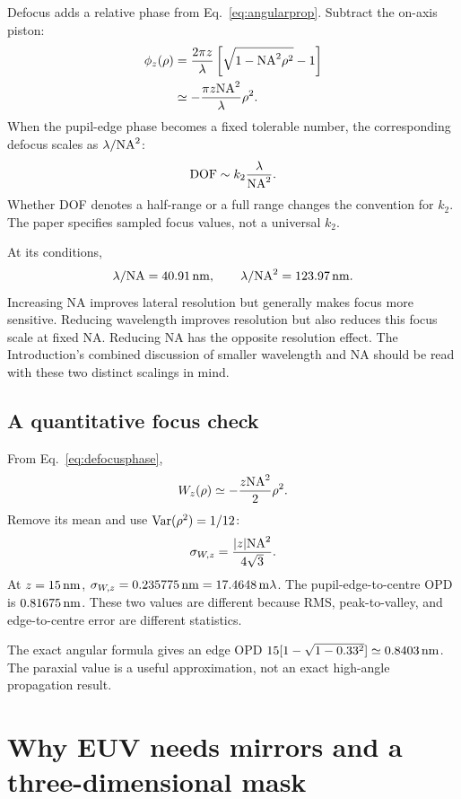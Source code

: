 Defocus adds a relative phase from Eq.~\eqref{eq:angularprop}.
Subtract the on-axis piston:
\begin{align}
\phi_z(\rho)
&=\frac{2\pi z}{\lambda}
\left[\sqrt{1-\mathrm{NA}^2\rho^2}-1\right]\\
&\simeq-\frac{\pi z\mathrm{NA}^2}{\lambda}\rho^2.
\label{eq:defocusphase}
\end{align}
When the pupil-edge phase becomes a fixed tolerable number, the
corresponding defocus scales as $\lambda/\mathrm{NA}^2$:
\begin{equation}
\mathrm{DOF}\sim k_2\frac{\lambda}{\mathrm{NA}^2}.
\end{equation}
Whether DOF denotes a half-range or a full range changes the convention
for $k_2$. The paper specifies sampled focus values, not a universal $k_2$.

At its conditions,
\[
\lambda/\mathrm{NA}=40.91\,\mathrm{nm},\qquad
\lambda/\mathrm{NA}^2=123.97\,\mathrm{nm}.
\]
Increasing NA improves lateral resolution but generally makes focus more
sensitive. Reducing wavelength improves resolution but also reduces this
focus scale at fixed NA. Reducing NA has the opposite resolution effect.
The Introduction's combined discussion of smaller wavelength and NA
should be read with these two distinct scalings in mind.

\section{A quantitative focus check}
From Eq.~\eqref{eq:defocusphase},
\[
W_z(\rho)\simeq-\frac{z\mathrm{NA}^2}{2}\rho^2.
\]
Remove its mean and use $\operatorname{Var}(\rho^2)=1/12$:
\begin{equation}
\sigma_{W,z}=\frac{|z|\mathrm{NA}^2}{4\sqrt3}.
\label{eq:defocusRMS}
\end{equation}
At $z=15\,\mathrm{nm}$, $\sigma_{W,z}=0.235775\,\mathrm{nm}
=17.4648\,\mathrm{m}\lambda$.
The pupil-edge-to-centre OPD is $0.81675\,\mathrm{nm}$.
These two values are different because RMS, peak-to-valley, and
edge-to-centre error are different statistics.

The exact angular formula gives an edge OPD
$15[1-\sqrt{1-0.33^2}]\simeq0.8403\,\mathrm{nm}$.
The paraxial value is a useful approximation, not an exact
high-angle propagation result.

\chapter{Why EUV needs mirrors and a three-dimensional mask}\label{ch:euv}

